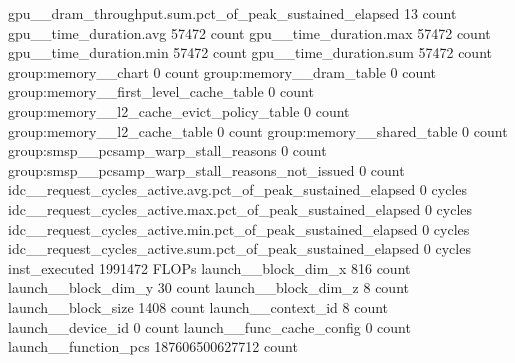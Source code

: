 gpu__dram_throughput.sum.pct_of_peak_sustained_elapsed                                        13 count
gpu__time_duration.avg                                                                     57472 count
gpu__time_duration.max                                                                     57472 count
gpu__time_duration.min                                                                     57472 count
gpu__time_duration.sum                                                                     57472 count
group:memory__chart                                                                            0 count
group:memory__dram_table                                                                       0 count
group:memory__first_level_cache_table                                                          0 count
group:memory__l2_cache_evict_policy_table                                                      0 count
group:memory__l2_cache_table                                                                   0 count
group:memory__shared_table                                                                     0 count
group:smsp__pcsamp_warp_stall_reasons                                                          0 count
group:smsp__pcsamp_warp_stall_reasons_not_issued                                               0 count
idc__request_cycles_active.avg.pct_of_peak_sustained_elapsed                                   0 cycles
idc__request_cycles_active.max.pct_of_peak_sustained_elapsed                                   0 cycles
idc__request_cycles_active.min.pct_of_peak_sustained_elapsed                                   0 cycles
idc__request_cycles_active.sum.pct_of_peak_sustained_elapsed                                   0 cycles
inst_executed                                                                            1991472 FLOPs
launch__block_dim_x                                                                          816 count
launch__block_dim_y                                                                           30 count
launch__block_dim_z                                                                            8 count
launch__block_size                                                                          1408 count
launch__context_id                                                                             8 count
launch__device_id                                                                              0 count
launch__func_cache_config                                                                      0 count
launch__function_pcs                                                             187606500627712 count
